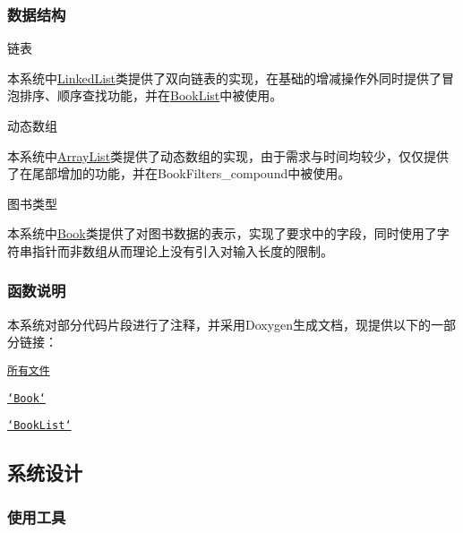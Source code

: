 \subsubsection*{数据结构}


\begin{DoxyEnumerate}
\item 链表

本系统中{\ttfamily \hyperlink{structLinkedList}{Linked\-List}}类提供了双向链表的实现，在基础的增减操作外同时提供了冒泡排序、顺序查找功能，并在{\ttfamily \hyperlink{structBookList}{Book\-List}}中被使用。
\item 动态数组

本系统中{\ttfamily \hyperlink{structArrayList}{Array\-List}}类提供了动态数组的实现，由于需求与时间均较少，仅仅提供了在尾部增加的功能，并在{\ttfamily Book\-Filters\-\_\-compound}中被使用。
\item 图书类型

本系统中{\ttfamily \hyperlink{structBook}{Book}}类提供了对图书数据的表示，实现了要求中的字段，同时使用了字符串指针而非数组从而理论上没有引入对输入长度的限制。
\end{DoxyEnumerate}

\subsubsection*{函数说明}

本系统对部分代码片段进行了注释，并采用{\ttfamily Doxygen}生成文档，现提供以下的一部分链接：


\begin{DoxyItemize}
\item \href{doxygen/html/files.html}{\tt 所有文件}
\item \href{doxygen/html/Book_8c.html}{\tt `\-Book`}
\item \href{doxygen/html/BookList_8c.html}{\tt `\-Book\-List`}
\end{DoxyItemize}

\subsection*{系统设计}

\subsubsection*{使用工具}


